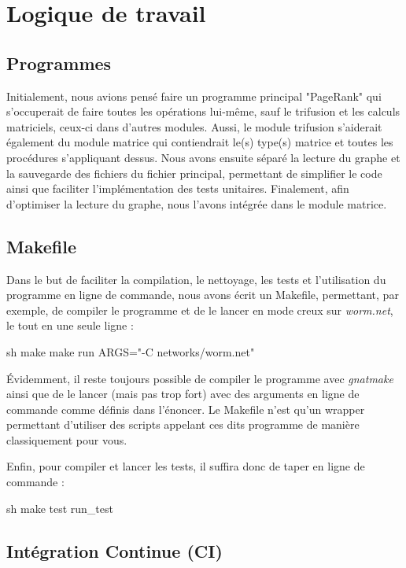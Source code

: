 \documentclass{NewTeX}
\begin{document}
\section{Logique de travail}
\subsection{Programmes}
Initialement, nous avions pensé faire un programme principal "PageRank" qui s'occuperait de faire toutes les opérations lui-même, sauf le trifusion et les calculs matriciels, ceux-ci dans d'autres modules. Aussi, le module trifusion s'aiderait également du module matrice qui contiendrait le(s) type(s) matrice et toutes les procédures s'appliquant dessus. 
Nous avons ensuite séparé la lecture du graphe et la sauvegarde des fichiers du fichier principal, permettant de simplifier le code ainsi que faciliter l'implémentation des tests unitaires.
Finalement, afin d'optimiser la lecture du graphe, nous l'avons intégrée dans le module matrice.

\subsection{Makefile}
Dans le but de  faciliter la compilation, le nettoyage, les tests et l'utilisation du programme en ligne de commande, nous avons écrit un Makefile, permettant, par exemple, de compiler le programme et de le lancer en mode creux sur \textit{worm.net}, le tout en une seule ligne :
\begin{code}{sh}
make make run ARGS="-C networks/worm.net"
\end{code}

Évidemment, il reste toujours possible de compiler le programme avec \textit{gnatmake} ainsi que de le lancer (mais pas trop fort) avec des arguments en ligne de commande comme définis dans l'énoncer.  Le Makefile n'est qu'un wrapper permettant d'utiliser des scripts appelant ces dits programme de manière classiquement pour vous.

Enfin, pour compiler et lancer les tests, il suffira donc de taper en ligne de commande : 
\begin{code}{sh}
make test run_test
\end{code}

\subsection{Intégration Continue (CI)}
\end{document}
